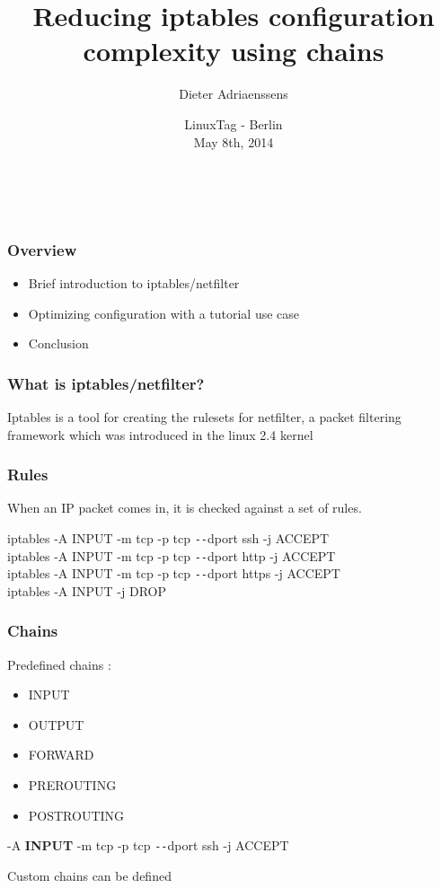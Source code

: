 \documentclass[14pt]{beamer}
\title[Reduce iptables config complexity]{Reducing iptables configuration complexity using chains}
\author{Dieter Adriaenssens}
\institute[UGent]{@dcadriaenssens - Ghent University, Belgium}
\date[LinuxTag 8May2014]{LinuxTag - Berlin\\
May 8th, 2014}
\newcommand{\dd}{{\texttt{-{}-}}}
\begin{document}
  \begin{frame}
  \titlepage
  \vfill
    \begin{center}
      \\[2.5ex]
        {\tiny\CcNote{\CcLongnameBySa}}
        \vspace*{-2.5ex}
    \end{center}
  \end{frame}
  \begin{frame}
    \frametitle{Overview}
    \begin{itemize}
      \item Brief introduction to iptables/netfilter
      \item Optimizing configuration with a tutorial use case
      \item Conclusion
    \end{itemize}
  \end{frame}
  \begin{frame}
    \frametitle{What is iptables/netfilter?}
    Iptables is a tool for creating the rulesets for netfilter, a packet filtering framework which was introduced in the linux 2.4 kernel
  \end{frame}
  \begin{frame}
    \frametitle{Rules}
    When an IP packet comes in, it is checked against a set of rules.
    \begin{example}
      \small{iptables -A INPUT -m tcp -p tcp \dd dport ssh -j ACCEPT\\
      iptables -A INPUT -m tcp -p tcp \dd dport http -j ACCEPT\\
      iptables -A INPUT -m tcp -p tcp \dd dport https -j ACCEPT\\
      iptables -A INPUT -j DROP}
    \end{example}
  \end{frame}
  \begin{frame}
    \frametitle{Chains}
    Predefined chains :
    \begin{itemize}
      \item INPUT
      \item OUTPUT
      \item FORWARD
      \item PREROUTING
      \item POSTROUTING
    \end{itemize}
    \begin{example}
      \small{-A \textbf{INPUT} -m tcp -p tcp \dd dport ssh -j ACCEPT}
    \end{example}
    Custom chains can be defined
  \end{frame}
\end{document}
